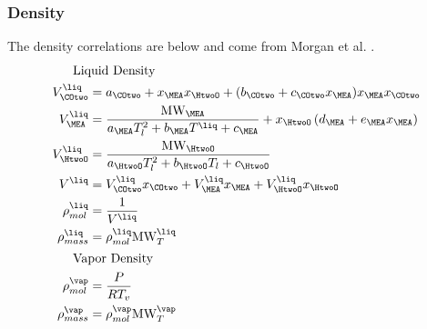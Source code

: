             \subsubsection{Density}
                The density correlations are below and come from Morgan et al. \cite{Morgan2015}. 
                \begin{align}
                    \shortintertext{\quad\; Liquid Density}
                    V^{\liq}_{\COtwo} &=  a_{\COtwo} + x_{\MEA} x_{\HtwoO} + (b_{\COtwo} + c_{\COtwo} x_{\MEA}) x_{\MEA} x_{\COtwo} \\
                    V^{\liq}_{\MEA} &=  \frac{\text{MW}_{\MEA}}{a_{\MEA} T_l^2 + b_{\MEA} T^{\liq} + c_{\MEA}} + x_{\HtwoO}\left(d_{\MEA} + e_{\MEA}x_{\MEA} \right) \\
                    V^{\liq}_{\HtwoO} &=  \frac{\text{MW}_{\HtwoO}}{a_{\HtwoO} T_l^2 + b_{\HtwoO} T_l + c_{\HtwoO}} \\
                    V^{\liq} &= V^{\liq}_{\COtwo}x_{\COtwo} + V^{\liq}_{\MEA}x_{\MEA} + V^{\liq}_{\HtwoO}x_{\HtwoO} \\
                    \rho ^{\liq}_{mol} &= \frac{1}{V^{\liq}} \\
                    \rho ^{\liq}_{mass} &= \rho ^{\liq}_{mol}\text{MW}^{\liq}_{T} \\
                    \shortintertext{\quad\; Vapor Density}
                    \rho ^{\vap}_{mol} &= \frac{P}{RT_v} \\
                    \rho ^{\vap}_{mass} &= \rho ^{\vap}_{mol}\text{MW}^{\vap}_{T}
                \end{align}


